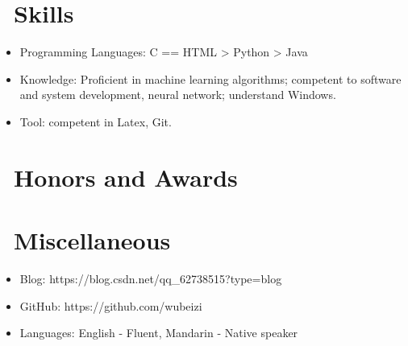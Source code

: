 \documentclass{resume}
\begin{document}
\section{\faCogs\ Skills}
\begin{itemize}[parsep=0.5ex]
  \item Programming Languages: C == HTML > Python > Java
  \item Knowledge: Proficient in machine learning algorithms; competent to software and system development, neural network; understand Windows.
  \item Tool: competent in Latex, Git.
\end{itemize}

\section{\faHeartO\ Honors and Awards}


\section{\faInfo\ Miscellaneous}
\begin{itemize}[parsep=0.5ex]
  \item Blog: https://blog.csdn.net/qq\_62738515?type=blog
  \item GitHub: https://github.com/wubeizi
  \item Languages: English - Fluent, Mandarin - Native speaker
\end{itemize}

%
%
\end{document}
